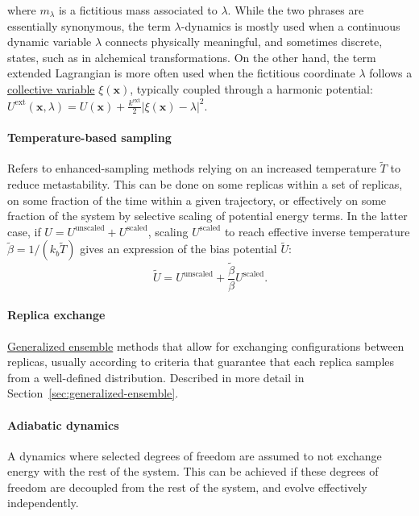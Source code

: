 \documentclass[9pt,review]{livecoms}
\newcommand{\vx}{\mathbf{x}}
\begin{document}
where $m_\lambda$ is a fictitious mass associated to $\lambda$.
While the two phrases are essentially synonymous, the term $\lambda$-dynamics is mostly used when a continuous dynamic variable $\lambda$ connects physically meaningful, and sometimes discrete, states, such as in alchemical transformations.
On the other hand, the term extended Lagrangian is more often used when  the fictitious coordinate $\lambda$ follows a \hyperlink{ref:CV} {collective variable} $\xi(\vx)$, typically coupled through a harmonic potential: $U^\text{ext}(\vx, \lambda) = U(\vx) + \frac{k^\mathrm{ext}}{2}|\xi(\vx)-\lambda|^2$.


\paragraph{Temperature-based sampling} Refers to enhanced-sampling methods relying on an increased temperature $\tilde T$ to reduce metastability. This can be done on some replicas within a set of replicas, on some fraction of the time within a given trajectory, or effectively on some fraction of the system by selective scaling of potential energy terms.
In the latter case, if $U = U^\mathrm{unscaled} + U^\mathrm{scaled}$, scaling $U^\mathrm{scaled}$ to reach effective inverse temperature $\tilde \beta = 1/(k_b \tilde T)$ gives an expression of the bias potential $\tilde U$:
\begin{equation}
\tilde U = U^\mathrm{unscaled} + \frac{\tilde \beta}{\beta} U^\mathrm{scaled}.
\end{equation}


\hypertarget{ref:ReplEx} {\paragraph{Replica exchange}} \hyperlink{ref:GenEns} {Generalized ensemble} methods that allow for exchanging configurations between replicas, usually according to criteria that guarantee that each replica samples from a well-defined distribution. Described in more detail in Section~\ref{sec:generalized-ensemble}.

\hypertarget{ref:AdiabaticDyn} {\paragraph{Adiabatic dynamics}}
A dynamics where selected degrees of freedom are assumed to not exchange energy with the rest of the system.
This can be achieved if these degrees of freedom are decoupled from the rest of the system, and evolve effectively independently.
\end{document}
